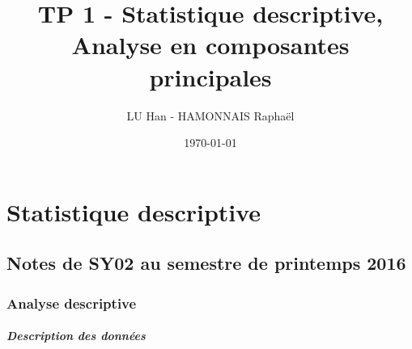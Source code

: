 \documentclass[a4paper,12pt]{report}
\title{TP 1 - Statistique descriptive, Analyse en composantes principales}
\author{LU Han - HAMONNAIS Raphaël}
\date{\today}
\begin{document}
\renewcommand{\labelitemi}{\large\textcolor{tatoebagreen}{\fg}}
\groovypdtitre
\restoregeometry %


\tableofcontents




\chapter{Statistique descriptive}

\section{Notes de SY02 au semestre de printemps 2016}

\subsection{Analyse descriptive}

\paragraph{Description des données}
\end{document}
